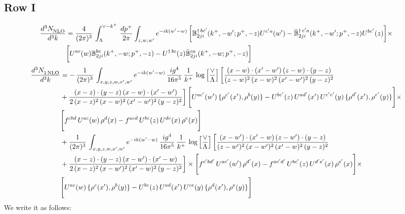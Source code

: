 \documentclass[9pt]{article}
\def\mf#1{\mathbb{#1}}
\numberwithin{equation}{section}
\begin{document}
\subsection{Row I}
\begin{align}
    \frac{d^{3}N_{\rm NLO}^{\rm}}{d^{3}k}  & = \frac{4}{(2\pi)^{3}}\,\int_{\Lambda}^{\vee-k^{+}}\, \frac{dp^{+}}{2\pi}\int_{z,w,w^{\prime}} e^{-ik(w^{\prime}-w)}\, \bigg[\mf{B}^{\dagger\, bc^{\prime}}_{2ji}(k^{+},-w^{\prime};p^{+},-z)U^{ c^{\prime}a}(w^{\prime}) -\Bar{\mf{B}}^{\dagger\, c^{\prime}a}_{2ji}(k^{+},-w^{\prime}; p^{+},-z)U^{bc^{\prime}}(z)\bigg]\times\notag \\ & \bigg[U^{ac}(w) \mf{B}^{bc}_{2ji}(k^{+},-w;p^{+},-z) -U^{\dagger\, bc}(z)\Bar{\mf{B}}^{ca}_{2ji}(k^{+},-w; p^{+},-z)\bigg]\nonumber
\end{align}
\begin{align}
 \frac{d^{3}N_{1\,\rm NLO}^{\rm}}{d^{3}k}  & =   -\, \frac{1}{(2\pi)^{3}}\,\int_{x,y,z,w,x',w^{\prime}} e^{-ik(w^{\prime}-w)}\,\frac{ig^{4}}{16\pi^{5}}\,\frac{1}{k^{+}}\,\log{\left[\frac{\vee}{\Lambda}\right]}\,\bigg[\frac{(x-w)\cdot (x'-w')\,(z-w)\cdot (y-z)}{(z-w)^{2}\,(x-w)^{2}\,(x'-w')^{2}\,(y-z)^{2}}\notag \\ & +\frac{(x-z)\cdot (y-z)\,(x-w)\cdot (x'-w')}{2\,(x-z)^{2}\, (x-w)^{2}\,(x'-w')^{2}\,(y-z)^{2}}\bigg]\, \Bigg[U^{ac'}(w')\,\{\rho^{c'}(x'),\rho^{b}(y)\}-U^{bc'}(z)\,U^{ad'}(x')\,U^{c'e'}(y)\, \{\rho^{d'}(x'),\rho^{e'}(y)\}\Bigg]\times \notag \\ & \Bigg[f^{cbd}\,U^{ac}(w)\,\rho^{d}(x)-f^{acd}\, U^{bc}(z)\,U^{de}(x)\,\rho^{e}(x)\Bigg]\notag \\ & + \frac{1}{(2\pi)^{3}}\,\int_{x,y,z,w,x',w^{\prime}} e^{-ik(w^{\prime}-w)}\,\frac{ig^{4}}{16\pi^{5}}\,\frac{1}{k^{+}}\,\log{\left[\frac{\vee}{\Lambda}\right]} \,\bigg[\frac{(x-w')\cdot (x'-w)\,(z-w')\cdot (y-z)}{(z-w')^{2}\,(x-w')^{2}\,(x'-w)^{2}\,(y-z)^{2}}\notag \\ & +\frac{(x-z)\cdot (y-z)\,(x-w')\cdot (x'-w)}{2\,(x-z)^{2}\, (x-w')^{2}\,(x'-w)^{2}\,(y-z)^{2}}\bigg] \times\Bigg[f^{c'bd'}\,U^{ac'}(w')\,\rho^{d'}(x)-f^{ac'd'}\, U^{bc'}(z)\,U^{d'e'}(x)\,\rho^{e'}(x)\Bigg] \times \notag \\ & \Bigg[U^{ac}(w)\,\{\rho^{c}(x'),\rho^{b}(y)\}-U^{bc}(z)\,U^{ad}(x')\,U^{ce}(y)\, \{\rho^{d}(x'),\rho^{e}(y)\}\Bigg]
\end{align}
We write it as follows: 
\end{document}
